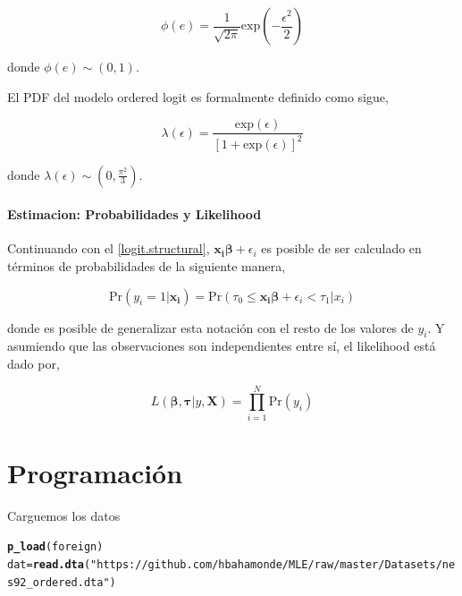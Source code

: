 \documentclass[onesided]{article}\usepackage[]{graphicx}\usepackage[]{color}
\makeatletter
\newcommand{\hlstr}[1]{\textcolor[rgb]{0.192,0.494,0.8}{#1}}%
\newcommand{\hlstd}[1]{\textcolor[rgb]{0.345,0.345,0.345}{#1}}%
\newcommand{\hlkwb}[1]{\textcolor[rgb]{0.69,0.353,0.396}{#1}}%
\newcommand{\hlkwd}[1]{\textcolor[rgb]{0.737,0.353,0.396}{\textbf{#1}}}%
\newenvironment{kframe}{%
 \def\at@end@of@kframe{}%
 \ifinner\ifhmode%
  \def\at@end@of@kframe{\end{minipage}}%
  \begin{minipage}{\columnwidth}%
 \fi\fi%
 \def\FrameCommand##1{\hskip\@totalleftmargin \hskip-\fboxsep
 \colorbox{shadecolor}{##1}\hskip-\fboxsep
     \hskip-\linewidth \hskip-\@totalleftmargin \hskip\columnwidth}%
 \MakeFramed {\advance\hsize-\width
   \@totalleftmargin\z@ \linewidth\hsize
   \@setminipage}}%
 {\par\unskip\endMakeFramed%
 \at@end@of@kframe}
\newenvironment{knitrout}{}{} %
\makeatother
\begin{document}
\begin{equation}%
\phi(e) = \frac{1}{\sqrt{2\pi}}\text{exp}(-\frac{\epsilon^{2}}{2})
\end{equation}

donde $\phi(e) \sim (0,1)$.

El PDF del modelo ordered logit es formalmente definido como sigue,

\begin{equation}%
\lambda(\epsilon) = \frac{\text{exp}(\epsilon)}{[1+\text{exp}(\epsilon)]^{2}}
\end{equation}

donde $\lambda(\epsilon)\sim(0, \frac{\pi^{2}}{3})$.

\paragraph{Estimacion: Probabilidades y Likelihood} Continuando con el \autoref{logit.structural}, $\boldsymbol{x_{i}}\boldsymbol{\beta} + \epsilon_{i}$ es posible de ser calculado en t\'erminos de probabilidades de la siguiente manera,


\begin{equation}%
\text{Pr}(y_{i}=1|\boldsymbol{x_{i}}) = \text{Pr}(\tau_{0} \leq \boldsymbol{x_{i}}\boldsymbol{\beta} + \epsilon_{i} < \tau_{1}|x_{i})
\end{equation}

donde es posible de generalizar esta notaci\'on con el resto de los valores de $y_{i}$. Y asumiendo que las observaciones son independientes entre s\'i, el likelihood est\'a dado por,

\begin{equation}%
L(\boldsymbol{\beta},\boldsymbol{\tau}|y, \boldsymbol{X}) = \prod_{i=1}^{N}\text{Pr}(y_{i})
\end{equation}

\section{Programaci\'on}

Carguemos los datos
\begin{knitrout}
\color{fgcolor}\begin{kframe}
\begin{alltt}
\hlkwd{p_load}\hlstd{(foreign)}
\hlstd{dat} \hlkwb{=} \hlkwd{read.dta}\hlstd{(}\hlstr{"https://github.com/hbahamonde/MLE/raw/master/Datasets/nes92_ordered.dta"}\hlstd{)}
\end{alltt}
\end{kframe}
\end{knitrout}
\end{document}

